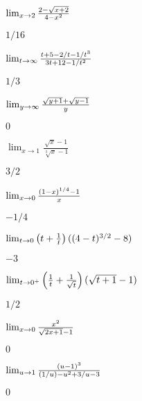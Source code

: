 \begin{exercises}
\begin{exercise} $\lim_{x\to2}{2-\sqrt{x+2}\over 4-x^2}$
\begin{answer} $1/16$
\end{answer}\end{exercise}

\begin{exercise} $\lim_{t\to\infty}{t+5-2/t-1/t^3\over 3t+12-1/t^2}$
\begin{answer} $1/3$
\end{answer}\end{exercise}

\begin{exercise} $\lim_{y\to\infty}{\sqrt{y+1}+\sqrt{y-1}\over y}$
\begin{answer} $0$
\end{answer}\end{exercise}

\begin{exercise} $\lim_{x\to1}\frac{\sqrt{x}-1}{\sqrt[3]{x}-1}$
\begin{answer} $3/2$
\end{answer}\end{exercise}

\begin{exercise} $\lim_{x\to0}{(1-x)^{1/4}-1\over x}$
\begin{answer} $-1/4$
\end{answer}\end{exercise}

\begin{exercise} $\lim_{t\to 0}{\left(t+{1\over t}\right)((4-t)^{3/2}-8)}$
\begin{answer} $-3$
\end{answer}\end{exercise}

\begin{exercise} $\lim_{t\to 0^+}\left({1\over t}+{1\over\sqrt{t}}\right)
(\sqrt{t+1}-1)$
\begin{answer} $1/2$
\end{answer}\end{exercise}

\begin{exercise} $\lim_{x\to 0}{x^2\over\sqrt{2x+1}-1}$
\begin{answer} $0$
\end{answer}\end{exercise}

\begin{exercise} $\lim_{u\to 1}{(u-1)^3\over (1/u)-u^2+3/u-3}$
\begin{answer} $0$
\end{answer}\end{exercise}


\end{exercises}
